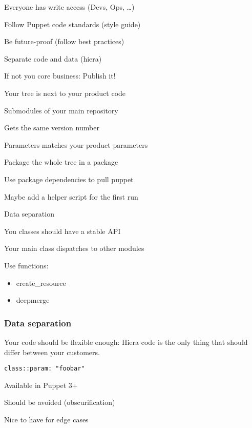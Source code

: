 \begin{iframe}
\item Everyone has write access (Devs, Ops, \dots)
\item Follow Puppet code standards (style guide)
\item Be future-proof (follow best practices)
\item Separate code and data (hiera)
\item If not you core business: Publish it!
\end{iframe}

\begin{iframe}
\item Your tree is next to your product code
\item Submodules of your main repository
\item Gets the same version number
\item Parameters matches your product parameters
\end{iframe}

\begin{iframe}
\item Package the whole tree in a package
\item Use package dependencies to pull puppet
\item Maybe add a helper script for the first run
\end{iframe}

\begin{iframe}[Hiera]
\item Data separation
\item You classes should have a stable API
\item Your main class dispatches to other modules
\item Use functions:
\begin{itemize}
    \item create\_resource
    \item deepmerge
\end{itemize}
\end{iframe}

\begin{frame}
    \frametitle{Data separation}
    \huge Your code should be flexible enough: Hiera code is the only thing that should differ between your customers.
\end{frame}

\begin{iframe}
\item{\texttt{class::param: "foobar"}}
\item Available in Puppet 3+
\item Should be avoided (obscurification)
\item Nice to have for edge cases
\end{iframe}

